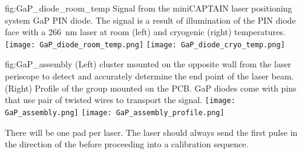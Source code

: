 

\begin{dunefigure}{fig:GaP_diode_room_temp}
{Signal from the miniCAPTAIN laser positioning system GaP PIN diode. The signal is a result of illumination of the PIN diode face with a \SI{266}{\nano\m} laser at room (left) and cryogenic (right) temperatures.}
\texttt{[image: GaP\_diode\_room\_temp.png]} 
\texttt{[image: GaP\_diode\_cryo\_temp.png]} 
\end{dunefigure}



\begin{dunefigure}{fig:GaP_assembly}
{(Left)  cluster mounted on the opposite wall from the laser periscope to detect and accurately determine the end point of the laser beam. (Right)
Profile of the  group mounted on the PCB. GaP diodes come with pins that use pair of twisted wires to transport the signal.
}
\texttt{[image: GaP\_assembly.png]} 
\texttt{[image: GaP\_assembly\_profile.png]} 
\end{dunefigure}


There will be one  pad per laser. The laser should always send the first pulse in the direction of the  before proceeding into a calibration sequence. 


